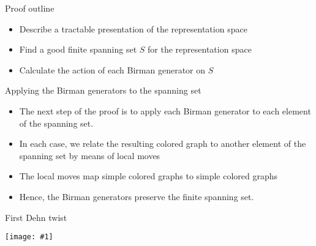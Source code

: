 \documentclass{beamer}
\newtheorem{prop}[theorem]{Proposition}
\newcommand{\img}[1]{
\vfill
\centering
\texttt{[image: \#1]}
\vfill
}
\begin{document}
\begin{frame}{Proof outline}
\begin{itemize}
  \item Describe a tractable presentation of  the representation space
  \item Find a good finite spanning set $S$ for the representation space
  \item Calculate the action of each Birman generator on $S$
\end{itemize}
\end{frame}


\begin{frame}{Applying the Birman generators to the spanning set}
\begin{itemize}
\item  The next step of the proof is to apply each Birman generator to each element of the spanning set.
\item  In each case, we relate the resulting colored graph to another element of the spanning set by means of local moves
\item  The local moves map simple colored graphs to simple colored graphs
\item Hence, the Birman generators preserve the finite spanning set.
\end{itemize}
\end{frame}

  
\begin{frame}{First Dehn twist}
\img{t1}
\end{frame}
\end{document}

